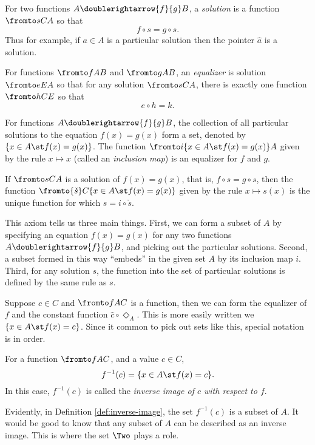 \begin{defn}\label{def:equalizer} 
	For two functions $A\doublerightarrow{f}{g} B$, a \emph{solution} is a function $\fromto sCA$ so that 
	\[f\circ s = g\circ s.\]
	Thus for example, if $a\in A$ is a particular solution then the pointer $\hat a$ is a solution. 

	For functions $\fromto fAB$ and $\fromto gAB$, an \emph{equalizer} is solution $\fromto eEA$ so that for any solution $\fromto sCA$, there is exactly one function $\fromto hCE$ so that \[e\circ h = k.\]
\end{defn}

\begin{principle}
	For functions $A\doublerightarrow{f}{g} B$, the collection of all particular solutions to the equation $f(x)=g(x)$ form a set, denoted by $\{x\in A\st f(x) = g(x)\}$. 	
	The function $\fromto i{\{x\in A\st f(x)=g(x)\}}A$ given by the rule $x\mapsto x$ (called an \emph{inclusion map}) is an equalizer for $f$ and $g$.
	
	If $\fromto sCA$ is a solution of  $f(x)=g(x)$, that is, $f\circ s = g\circ s$,
	then the function $\fromto {\check s}C{\{x\in A\st f(x)=g(x)\}}$ given by the rule $x\mapsto s(x)$
	is the unique function for which $s = i\circ \check s$. 
\end{principle}

This axiom tells us three main things.
First, we can form a subset of $A$ by specifying an equation $f(x)=g(x)$ for any two functions $A\doublerightarrow{f}{g}B$, and picking out the particular solutions.
Second, a subset formed in this way ``embeds'' in the given set $A$ by its inclusion map $i$.
Third, for any solution $s$, the function into the set of particular solutions is defined by the same rule as $s$.

Suppose $c\in C$ and $\fromto fAC$ is a function, then we can form the equalizer of $f$ and the constant function $\hat{c}\circ\Diamond_A$.
This is more easily written we $\{x\in A\st f(x)=c\}$.
Since it common to pick out sets like this, special notation is in order.

\begin{defn}\label{def:inverse-image}
	For a function $\fromto fAC$, and a value $c\in C$, 
	\[f^{-1}(c) = \{x\in A\st f(x)=c\}.\] 
	In this case, $f^{-1}(c)$ is called the \emph{inverse image of $c$ with respect to $f$}.
\end{defn}

Evidently, in Definition \ref{def:inverse-image}, the set $f^{-1}(c)$ is a subset of $A$.
It would be good to know that any subset of $A$ can be described as an inverse image.
This is where the set $\Two$ plays a role.

